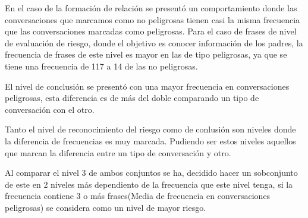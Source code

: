 En el caso de la formaci\'on de relaci\'on se present\'o un comportamiento donde las conversaciones que marcamos como no peligrosas tienen casi la misma frecuencia que las conversaciones marcadas como peligrosas. Para el caso de frases de nivel de evaluaci\'on de riesgo, donde el objetivo es conocer informaci\'on de los padres, la frecuencia de frases de este nivel es mayor en las de tipo peligrosas, ya que se tiene una frecuencia de 117 a 14 de las no peligrosas. 

El nivel de conclusi\'on se present\'o con una mayor frecuencia en conversaciones peligrosas, esta diferencia es de m\'as del doble comparando un tipo de conversaci\'on con el otro.

Tanto el nivel de reconocimiento del riesgo como de conlusi\'on son niveles donde la diferencia de frecuencias es muy marcada. Pudiendo ser estos niveles aquellos que marcan la diferencia entre un tipo de conversaci\'on y otro. 

Al comparar el nivel 3 de ambos conjuntos se ha, decidido hacer un sobconjunto de este en 2 niveles m\'as dependiento de la frecuencia que este nivel tenga, si la frecuencia contiene 3 o m\'as frases(Media de frecuencia en conversaciones peligrosas) se considera como un nivel de mayor riesgo. 

